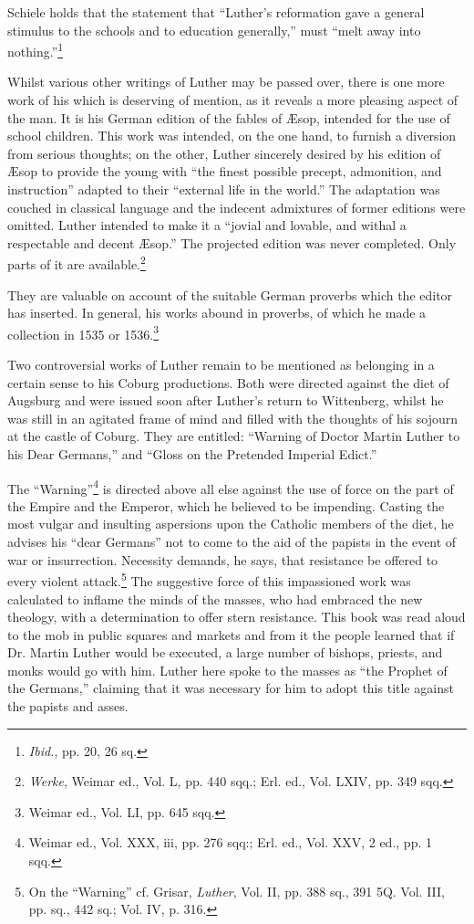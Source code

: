 Schiele holds that the statement that “Luther’s reformation gave a general
stimulus to the schools and to education generally,” must “melt away
into nothing.”\footnote{\textit{Ibid.}, pp. 20, 26 sq.}


Whilst various other writings of Luther may be passed over, there
is one more work of his which is deserving of mention, as it reveals
a more pleasing aspect of the man. It is his German edition of the
fables of Æsop, intended for the use of school children. This work
was intended, on the one hand, to furnish a diversion from serious
thoughts; on the other, Luther sincerely desired by his edition of
Æsop to provide the young with “the finest possible precept, admonition,
and instruction” adapted to their “external life in the world.”
The adaptation was couched in classical language and the indecent
admixtures of former editions were omitted. Luther intended to make
it a “jovial and lovable, and withal a respectable and decent Æsop.”
The projected edition was never completed. Only parts of it are
available.\footnote{\textit{Werke}, Weimar ed., Vol. L, pp. 440 sqq.; Erl. ed., Vol. LXIV, pp. 349 sqq.}

They are valuable on account of the suitable German
proverbs which the editor has inserted. In general, his works abound
in proverbs, of which he made a collection in 1535 or 1536.\footnote{Weimar ed., Vol. LI, pp. 645 sqq.}

Two controversial works of Luther remain to be mentioned as belonging
in a certain sense to his Coburg productions. Both were directed against
the diet of Augsburg and were issued soon after Luther’s return to Wittenberg,
whilst he was still in an agitated frame
of mind and filled with the thoughts of his sojourn at the castle of
Coburg. They are entitled: “Warning of Doctor Martin Luther to
his Dear Germans,” and “Gloss on the Pretended Imperial Edict.”

The “Warning”\footnote{Weimar ed., Vol. XXX, iii, pp. 276 sqq:; Erl. ed., Vol. XXV, 2 ed., pp. 1 sqq.}
is directed above all else against the use of force
on the part of the Empire and the Emperor, which he believed to be
impending. Casting the most vulgar and insulting aspersions upon
the Catholic members of the diet, he advises his “dear Germans” not
to come to the aid of the papists in the event of war or insurrection.
Necessity demands, he says, that resistance be offered to every violent
attack.\footnote{On the “Warning” cf. Grisar, \textit{Luther}, Vol. II, pp. 388 sq., 391 5Q. Vol. III, pp. sq.,
442 sq.; Vol. IV, p. 316.}
The suggestive force of this impassioned work was calculated
to inflame the minds of the masses, who had embraced the new
theology, with a determination to offer stern resistance. This book
was read aloud to the mob in public squares and markets and from it
the people learned that if Dr. Martin Luther would be executed, a
large number of bishops, priests, and monks would go with him.
Luther here spoke to the masses as “the Prophet of the Germans,”
claiming that it was necessary for him to adopt this title against the
papists and asses.

